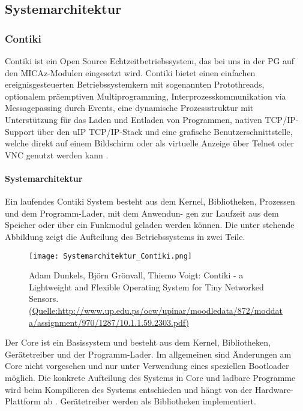 \subsection{Systemarchitektur}

\subsubsection{Contiki}
Contiki ist ein Open Source Echtzeitbetriebssystem, das bei uns in der PG auf den MICAz-Modulen eingesetzt wird.
Contiki bietet einen einfachen ereignisgesteuerten Betriebssystemkern mit sogenannten Protothreads, optionalem 
pr\"aemptiven Multiprogramming, Interprozesskommunikation via Messagepassing durch Events, eine dynamische Prozessstruktur
mit Unterst\"utzung f\"ur das Laden und Entladen von Programmen, nativen TCP/IP-Support über den uIP TCP/IP-Stack und eine 
grafische Benutzerschnittstelle, welche direkt auf einem Bildschirm oder als virtuelle Anzeige \"uber Telnet oder VNC genutzt werden kann \cite{Wikipedia:2013:Online}.
 
\paragraph{Systemarchitektur}
Ein laufendes Contiki System besteht aus dem Kernel, Bibliotheken, Prozessen und dem Programm-Lader, mit dem Anwendun-
gen zur Laufzeit aus dem Speicher oder \"uber ein Funkmodul geladen werden k\"onnen. Die unter stehende Abbildung zeigt die Aufteilung des Betriebssystems in zwei Teile. 
\begin{figure}[h!]
	\centering
		\texttt{[image: Systemarchitektur\_Contiki.png]}
	\caption{Adam Dunkels, Bj\"orn Gr\"onvall, Thiemo Voigt: Contiki - a Lightweight and Flexible Operating System for Tiny Networked
	Sensors. \url{(Quelle:http://www.up.edu.ps/ocw/upinar/moodledata/872/moddata/assignment/970/1287/10.1.1.59.2303.pdf)}}
	\label{Systemarchitektur von Contiki}
\end{figure}
Der Core ist ein Basissystem und besteht aus dem Kernel, Bibliotheken, Ger\"{a}tetreiber und der Programm-Lader. 
Im allgemeinen sind \"Anderungen am Core nicht vorgesehen und nur unter Verwendung eines speziellen Bootloader m\"oglich. 
Die konkrete Aufteilung des Systems in Core und ladbare Programme wird beim Kompilieren des Systems entschieden und h\"angt 
von der Hardware-Plattform ab \cite[vgl.][S. 7]{Walter:2010}. Ger\"atetreiber werden als Bibliotheken implementiert. 

